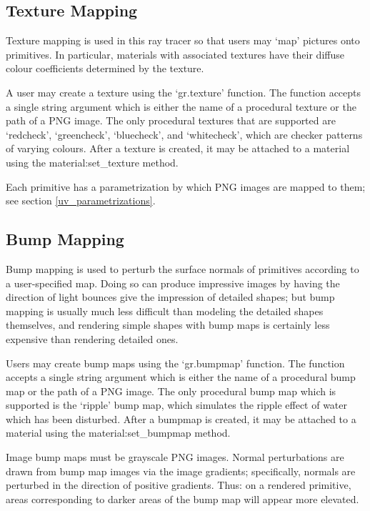 \documentclass{article}
\begin{document}
\subsection{Texture Mapping}

Texture mapping is used in this ray tracer so that users may `map' pictures onto
primitives. In particular, materials with associated textures have their diffuse
colour coefficients determined by the texture.

A user may create a texture using the `gr.texture' function. The function
accepts a single string argument which is either the name of a procedural
texture or the path of a PNG image. The only procedural textures that are
supported are `redcheck', `greencheck', `bluecheck', and `whitecheck', which are
checker patterns of varying colours. After a texture is created, it may be
attached to a material using the material:set_texture method.

Each primitive has a parametrization by which PNG images are mapped to them; see
section \ref{uv_parametrizations}.


\subsection{Bump Mapping}

Bump mapping is used to perturb the surface normals of primitives according to a
user-specified map. Doing so can produce impressive images by having the
direction of light bounces give the impression of detailed shapes; but bump
mapping is usually much less difficult than modeling the detailed shapes
themselves, and rendering simple shapes with bump maps is certainly less
expensive than rendering detailed ones.

Users may create bump maps using the `gr.bumpmap' function. The function accepts
a single string argument which is either the name of a procedural bump map or the
path of a PNG image. The only procedural bump map which is supported is the
`ripple' bump map, which simulates the ripple effect of water which has been
disturbed. After a bumpmap is created, it may be attached to a material using
the material:set_bumpmap method.

Image bump maps must be grayscale PNG images. Normal perturbations are drawn
from bump map images via the image gradients; specifically, normals are
perturbed in the direction of positive gradients. Thus: on a rendered primitive,
areas corresponding to darker areas of the bump map will appear more elevated.
\end{document}
